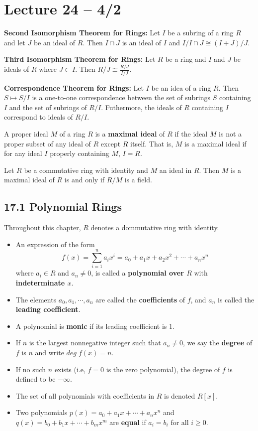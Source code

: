 \documentclass{article}
\begin{document}
\section{Lecture 24 -- 4/2}
\begin{theorem}
  \textbf{Second Isomorphism Theorem for Rings:} Let $I$ be a subring of a ring $R$ and let $J$ be an ideal of $R$. Then $I\cap J$ is an ideal of $I$ and $I/I\cap J\cong (I+J)/J$.
\end{theorem}
\begin{theorem}
  \textbf{Third Isomorphism Theorem for Rings:} Let $R$ be a ring and  $I$ and $J$ be ideals of $R$ where $J\subset I$. Then $R/J\cong\frac{R/J}{I/J}$.
\end{theorem}
\begin{theorem}
  \textbf{Correspondence Theorem for Rings:} Let $I$ be an idea of a ring $R$. Then $S\mapsto S/I$ is a one-to-one correspondence between the set of subrings $S$ containing $I$ and the set of subrings of $R/I$. Futhermore, the ideals of $R$ containing $I$ correspond to ideals of $R/I.$
\end{theorem}
A proper ideal $M$ of a ring $R$ is a \textbf{maximal ideal} of $R$ if the ideal $M$ is not a proper subset of any ideal of $R$ except $R$ itself. That is, $M$ is a maximal ideal if for any ideal $I$ properly containing $M$, $I = R$.
\begin{theorem}
  Let $R$ be a commutative ring with identity and $M$ an ideal in $R$. Then $M$ is a maximal ideal of $R$ is and only if $R/M$ is a field.
\end{theorem}
\subsection{17.1 Polynomial Rings}
\begin{definition}
  Throughout this chapter, $R$ denotes a dommutative ring with identity.
  \begin{itemize}
    \item An expression of the form \[f(x)=\sum_{i=1}^n a_ix^i=a_0+a_1x+a_2x^2+\cdots+a_nx^n\] where $a_i\in R$ and $a_n\neq0$, is called a \textbf{polynomial over $R$} with \textbf{indeterminate $x$}.
    \item The elements $a_0, a_1,\cdots,a_n$ are called the \textbf{coefficients} of $f$, and $a_n$ is called the \textbf{leading coefficient}.
    \item A polynomial is \textbf{monic} if its leading coefficient is 1.
    \item If $n$ is the largest nonnegative integer such that $a_n\neq0$, we say the \textbf{degree} of $f$ is $n$ and write $deg\;f(x)=n$.
    \item If no such $n$ exists (i.e, $f=0$ is the zero polynomial), the degree of $f$ is defined to be $-\infty$.
    \item The set of all polynomials with coefficients in $R$ is denoted $R[x]$.
    \item Two polynomials $p(x)=a_0+a_1x+\cdots+a_nx^n$ and $q(x)=b_0+b_1x+\cdots+b_mx^m$ are \textbf{equal} if $a_i=b_i$ for all $i\geq0$.
  \end{itemize}
\end{definition}
\end{document}
